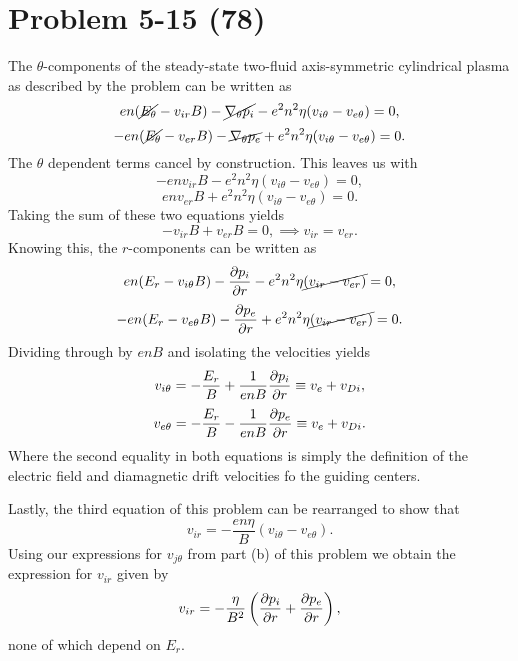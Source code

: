 \section*{Problem 5-15 (78)}
\label{sec:5-15}
The \(\theta\)-components of the steady-state two-fluid axis-symmetric cylindrical plasma as described by the problem can be written as
\begin{equation*}
	en(\cancel{E_\theta}- v_{ir}B) - \cancel{\nabla_\theta p_i} - e^2n^2\eta(v_{i\theta} - v_{e\theta}) = 0,
\end{equation*}
\begin{equation*}
	-en(\cancel{E_\theta} - v_{er}B) - \cancel{\nabla_\theta p_e} + e^2n^2\eta(v_{i\theta} - v_{e\theta}) = 0.
\end{equation*}
The \(\theta \) dependent terms cancel by construction. This leaves us with 
\begin{equation*}
	-en v_{ir}B - e^2n^2\eta(v_{i\theta} - v_{e\theta}) = 0,
\end{equation*}
\begin{equation*}
	env_{er}B + e^2n^2\eta(v_{i\theta} - v_{e\theta}) = 0.
\end{equation*}
Taking the sum of these two equations yields
\begin{equation*}
	-v_{ir}B + v_{er}B = 0, \implies v_{ir} = v_{er}.
\end{equation*}
Knowing this, the \(r\)-components can be written as
\begin{equation*}
	en(E_r- v_{i\theta}B) - \frac{\partial p_i}{\partial r} - e^2n^2\eta\cancel{(v_{ir} - v_{er})} = 0,
\end{equation*}
\begin{equation*}
	-en(E_r - v_{e\theta}B) - \frac{\partial p_e}{\partial r} + e^2n^2\eta\cancel{(v_{ir} - v_{er})} = 0.
\end{equation*}
Dividing through by \(enB \) and isolating the velocities yields
\begin{equation*}
	v_{i\theta} = -\dfrac{E_r}{B} + \dfrac{1}{enB}\frac{\partial p_i}{\partial r} \equiv v_e + v_{Di},
\end{equation*}
\begin{equation*}
	v_{e\theta} = -\dfrac{E_r}{B} - \dfrac{1}{enB}\frac{\partial p_e}{\partial r} \equiv v_e + v_{Di}.
\end{equation*}
Where the second equality in both equations is simply the definition of the electric field and diamagnetic drift velocities fo the guiding centers. 

Lastly, the third equation of this problem can be rearranged to show that
\begin{equation*}
	v_{ir} = - \dfrac{en\eta}{B}\left(v_{i\theta} - v_{e\theta} \right).
\end{equation*}
Using our expressions for \(v_{j\theta} \) from part (b) of this problem we obtain the expression for \(v_{ir}\) given by
\begin{equation*}
	v_{ir} = - \dfrac{\eta}{B^2}\left(\frac{\partial p_i}{\partial r} + \frac{\partial p_e}{\partial r} \right),
\end{equation*}
none of which depend on \(E_r\).

